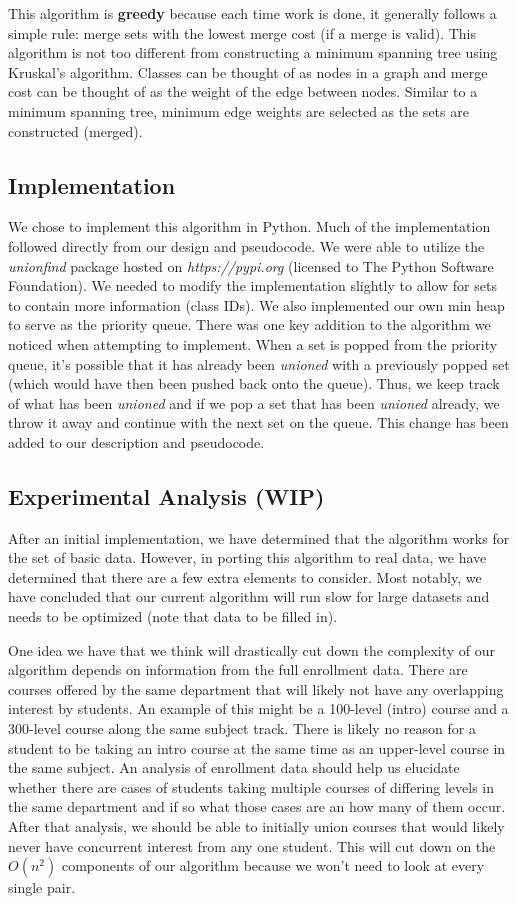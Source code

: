 \documentclass[11pt, oneside]{article}   	%
\begin{document}
This algorithm is {\bf greedy} because each time work is done, it generally follows a simple rule: merge sets with the lowest merge cost (if a merge is valid). This algorithm is not too different from constructing a minimum spanning tree using Kruskal's algorithm. Classes can be thought of as nodes in a graph and merge cost can be thought of as the weight of the edge between nodes. Similar to a minimum spanning tree, minimum edge weights are selected as the sets are constructed (merged). 

\subsection{Implementation}
We chose to implement this algorithm in Python. Much of the implementation followed directly from our design and pseudocode. We were able to utilize the {\it unionfind} package hosted on {\it https://pypi.org} (licensed to The Python Software Foundation). We needed to modify the implementation slightly to allow for sets to contain more information (class IDs). We also implemented our own min heap to serve as the priority queue. There was one key addition to the algorithm we noticed when attempting to implement. When a set is popped from the priority queue, it's possible that it has already been {\it unioned} with a previously popped set (which would have then been pushed back onto the queue). Thus, we keep track of what has been {\it unioned} and if we pop a set that has been {\it unioned} already, we throw it away and continue with the next set on the queue. This change has been added to our description and pseudocode.

\subsection{Experimental Analysis (WIP)}
After an initial implementation, we have determined that the algorithm works for the set of basic data. However, in porting this algorithm to real data, we have determined that there are a few extra elements to consider. Most notably, we have concluded that our current algorithm will run slow for large datasets and needs to be optimized (note that data to be filled in). 

One idea we have that we think will drastically cut down the complexity of our algorithm depends on information from the full enrollment data. There are courses offered by the same department that will likely not have any overlapping interest by students. An example of this might be a 100-level (intro) course and a 300-level course along the same subject track. There is likely no reason for a student to be taking an intro course at the same time as an upper-level course in the same subject. An analysis of enrollment data should help us elucidate whether there are cases of students taking multiple courses of differing levels in the same department and if so what those cases are an how many of them occur. After that analysis, we should be able to initially union courses that would likely never have concurrent interest from any one student. This will cut down on the $O(n^2)$ components of our algorithm because we won't need to look at every single pair.
\end{document}
